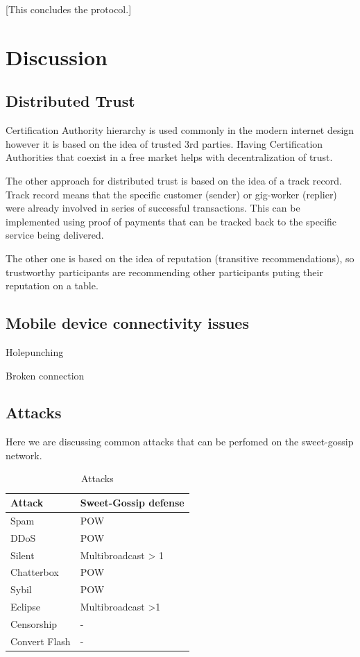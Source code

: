 \documentclass{article}
\begin{document}
[This concludes the protocol.]


\section{Discussion}

\subsection{Distributed Trust}

Certification Authority hierarchy is used commonly in the modern internet design however it is based on the idea of trusted 3rd parties. Having Certification Authorities that coexist in a free market helps with decentralization of trust.

The other approach for distributed trust is based on the idea of a track record. Track record means that the specific customer (sender) or gig-worker (replier) were already involved in series of successful transactions. This can be implemented using proof of payments that can be tracked back to the specific service being delivered.

The other one is based on the idea of reputation (transitive recommendations), so trustworthy participants are recommending other participants puting their reputation on a table.

\subsection{Mobile device connectivity issues}


Holepunching \cite{HolePunching}

Broken connection

\subsection{Attacks}
Here we are discussing common attacks that can be perfomed on the sweet-gossip network.


\begin{table}  
	\centering
	\begin{tabular}{ll}
		\toprule
		Attack         &   Sweet-Gossip defense \\
		\midrule
		Spam           & POW \\
		DDoS           & POW \\
		Silent         & Multibroadcast > 1 \\
		Chatterbox     & POW \\
		Sybil          & POW \\
		Eclipse        & Multibroadcast >1 \\
		Censorship     & - \\
		Convert Flash  & - \\
		\bottomrule
	\end{tabular}
	\label{tab:attacks}
	\caption{Attacks}
\end{table}
\end{document}
